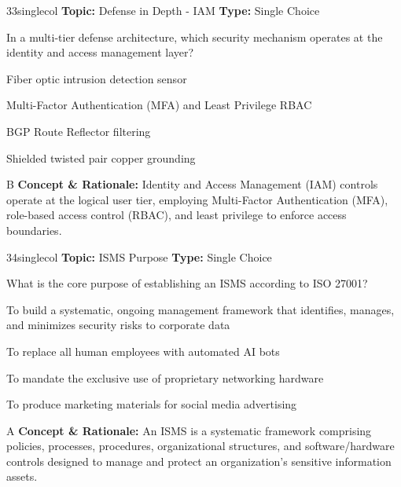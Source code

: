 \begin{qcard}{33}{singlecol}
\textcolor{darkslate!75}{\small\textbf{Topic:} Defense in Depth - IAM \hfill \textbf{Type:} Single Choice}\vspace{0.4em}\par
In a multi-tier defense architecture, which security mechanism operates at the identity and access management layer?
\begin{qoptions}
\item Fiber optic intrusion detection sensor
\item Multi-Factor Authentication (MFA) and Least Privilege RBAC
\item BGP Route Reflector filtering
\item Shielded twisted pair copper grounding
\end{qoptions}
\end{qcard}
\nopagebreak
\begin{explainbox}{B}
\textbf{Concept \& Rationale:} Identity and Access Management (IAM) controls operate at the logical user tier, employing Multi-Factor Authentication (MFA), role-based access control (RBAC), and least privilege to enforce access boundaries.
\end{explainbox}

\begin{qcard}{34}{singlecol}
\textcolor{darkslate!75}{\small\textbf{Topic:} ISMS Purpose \hfill \textbf{Type:} Single Choice}\vspace{0.4em}\par
What is the core purpose of establishing an ISMS according to ISO 27001?
\begin{qoptions}
\item To build a systematic, ongoing management framework that identifies, manages, and minimizes security risks to corporate data
\item To replace all human employees with automated AI bots
\item To mandate the exclusive use of proprietary networking hardware
\item To produce marketing materials for social media advertising
\end{qoptions}
\end{qcard}
\nopagebreak
\begin{explainbox}{A}
\textbf{Concept \& Rationale:} An ISMS is a systematic framework comprising policies, processes, procedures, organizational structures, and software/hardware controls designed to manage and protect an organization's sensitive information assets.
\end{explainbox}

